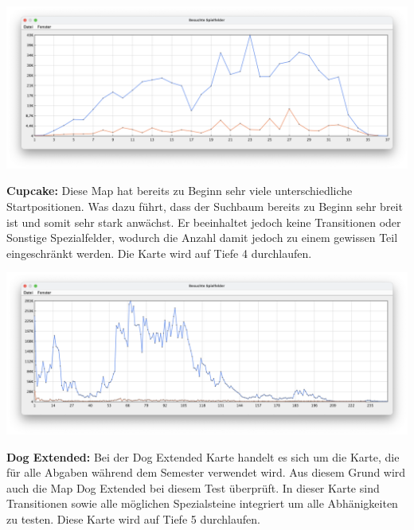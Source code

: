 \begin{minipage}{\linewidth}
    \centering
    \includegraphics[width=0.9\linewidth]{statistic/CUBOID-01/ST-01-D4-LD}
    \label{fig:statistic-graph-cuboid}
\end{minipage}
\vspace{1em}

\textbf{Cupcake:}
Diese Map hat bereits zu Beginn sehr viele unterschiedliche Startpositionen.
Was dazu f\"uhrt, dass der Suchbaum bereits zu Beginn sehr breit ist und somit sehr stark anw\"achst.
Er beeinhaltet jedoch keine Transitionen oder Sonstige Spezialfelder, wodurch die Anzahl damit jedoch zu einem gewissen Teil eingeschr\"ankt werden.
Die Karte wird auf Tiefe 4 durchlaufen.

\begin{minipage}{\linewidth}
    \centering
    \includegraphics[width=0.9\linewidth]{statistic/CUP-01/ST-01-D4-LD}
    \label{fig:statistic-graph-cupcake}
\end{minipage}
\vspace{1em}

\textbf{Dog Extended:}
Bei der Dog Extended Karte handelt es sich um die Karte, die f\"ur alle Abgaben w\"ahrend dem Semester verwendet wird.
Aus diesem Grund wird auch die Map Dog Extended bei diesem Test \"uberpr\"uft.
In dieser Karte sind Transitionen sowie alle m\"oglichen Spezialsteine integriert um alle Abh\"anigkeiten zu testen.
Diese Karte wird auf Tiefe 5 durchlaufen.

